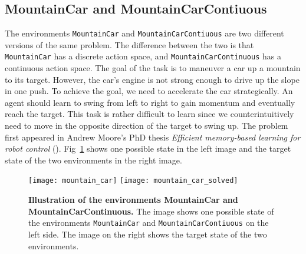 \subsection{MountainCar and MountainCarContiuous}
The environments \verb|MountainCar| and \verb|MountainCarContiuous| are two different versions of the same problem. The difference between the two is that \verb|MountainCar| has a discrete action space, and \verb|MountainCarContinuous| has a continuous action space. The goal of the task is to maneuver a car up a mountain to its target. However, the car's engine is not strong enough to drive up the slope in one push. To achieve the goal, we need to accelerate the car strategically. An agent should learn to swing from left to right to gain momentum and eventually reach the target. This task is rather difficult to learn since we counterintuitively need to move in the opposite direction of the target to swing up. The problem first appeared in Andrew Moore's PhD thesis \emph{Efficient memory-based learning for robot control} (\cite{moore1990efficient}). Fig~\ref{fig:mountain_car} shows one possible state in the left image and the target state of the two environments in the right image.
\begin{figure}[!ht]
  \centering
  \texttt{[image: mountain\_car]} \hspace*{10mm} \texttt{[image: mountain\_car\_solved]}
\caption[Illustration of the environment MountainCar]{
  \textbf{Illustration of the environments MountainCar and MountainCarContinuous.}
  The image shows one possible state of the environments \texttt{MountainCar} and \texttt{MountainCarContiuous} on the left side. The image on the right shows the target state of the two environments.
}
\label{fig:mountain_car}
\end{figure}

